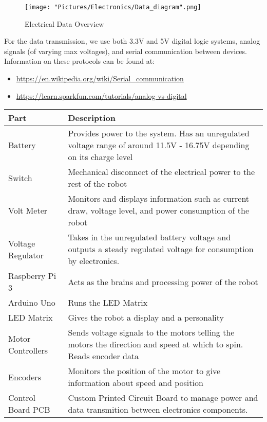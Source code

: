 \documentclass{article}
\begin{document}
\begin{figure}[H]
  	\centering
   	\texttt{[image: "Pictures/Electronics/Data\_diagram".png]}
  	\caption{Electrical Data Overview}
	\label{data}
\end{figure}

\noindent For the data transmission, we use both 3.3V and 5V digital logic systems, analog signals (of varying max voltages), and serial communication between devices. Information on these protocols can be found at:

\begin{itemize}
	\item \href{https://en.wikipedia.org/wiki/Serial_communication}{https://en.wikipedia.org/wiki/Serial\_communication}
	\item \href{https://learn.sparkfun.com/tutorials/analog-vs-digital}{https://learn.sparkfun.com/tutorials/analog-vs-digital}
\end{itemize}


\begin{tabular}[2]{|p{4cm}|p{11cm}|}
	\hline
	\textbf{Part} & \textbf{Description} \\ \hline
	Battery & Provides power to the system. Has an unregulated voltage range of around 11.5V - 16.75V depending on its charge level \\ \hline
	Switch & Mechanical disconnect of the electrical power to the rest of the robot \\ \hline
	Volt Meter & Monitors and displays information such as current draw, voltage level, and power consumption of the robot \\ \hline
	Voltage Regulator & Takes in the unregulated battery voltage and outputs a steady regulated voltage for consumption by electronics. \\ \hline
	Raspberry Pi 3 & Acts as the brains and processing power of the robot \\ \hline
	Arduino Uno & Runs the LED Matrix \\ \hline
	LED Matrix & Gives the robot a display and a personality\\ \hline
	Motor Controllers & Sends voltage signals to the motors telling the motors the direction and speed at which to spin. Reads encoder data \\ \hline
	Encoders & Monitors the position of the motor to give information about speed and position \\ \hline
	Control Board PCB & Custom Printed Circuit Board to manage power and data transmition between electronics components. \\ \hline
\end{tabular}
\end{document}
